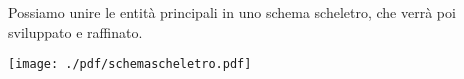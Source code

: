 Possiamo unire le entità principali in uno schema scheletro, che verrà poi sviluppato e raffinato.

\texttt{[image: ./pdf/schemascheletro.pdf]}
